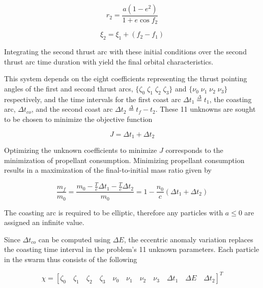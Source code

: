 \begin{equation}
r_2 = \dfrac{a(1-e^2)}{1+e\cos{f_2}}
\label{r2}
\end{equation}

\begin{equation}
\xi_2 = \xi_1 + (f_2-f_1)
\end{equation}

\noindent Integrating the second thrust arc with these initial conditions over the second thrust arc time duration with yield the final orbital characteristics. \newline

\noindent This system depends on the eight coefficients representing the thrust pointing angles of the first and second thrust arcs, 
$\{\zeta_0 \; \zeta_1 \; \zeta_2 \; \zeta_3 \}$ and $\{\nu_0 \; \nu_1 \; \nu_2 \; \nu_3 \}$ respectively, and the time intervals for the first coast arc
$\Delta t_1 \overset{\Delta}{=} t_1$, the coasting arc, $\Delta t_{co}$, and the second coast arc $\Delta t_2 \overset{\Delta}{=} t_f-t_2 $. These 11 unknowns are sought to be chosen to minimize the objective function 

\begin{equation}
J = \Delta t_1 + \Delta t_2
\label{J}
\end{equation}

\noindent Optimizing the unknown coefficients to minimize $J$ corresponds to the minimization of propellant consumption. Minimizing propellant consumption
results in a maximization of the final-to-initial mass ratio given by 

\begin{equation}
\dfrac{m_f}{m_0} = \dfrac{m_0-\frac{T}{c}\Delta t_1-\frac{T}{c}\Delta t_2}{m_0} = 1-\dfrac{n_0}{c}(\Delta t_1 +\Delta t_2)
\label{finalToInitialMassRatio}
\end{equation}

\noindent The coasting arc is required to be elliptic, therefore any particles with $a \leq 0$ are assigned an infinite value. \newline

\noindent Since $\Delta t_{co}$ can be computed using $\Delta E$, the eccentric anomaly variation replaces the coasting time interval in the 
problem's 11 unknown parameters. Each particle in the swarm thus consists of the following

\begin{equation}
\chi = [ \zeta_0 \quad \zeta_1 \quad \zeta_2 \quad \zeta_3 \quad \nu_0 \quad \nu_1 \quad \nu_2 \quad \nu_3 \quad \Delta t_1 \quad \Delta E \quad \Delta t_2 ]^T
\label{particleUnkowns}
\end{equation}

